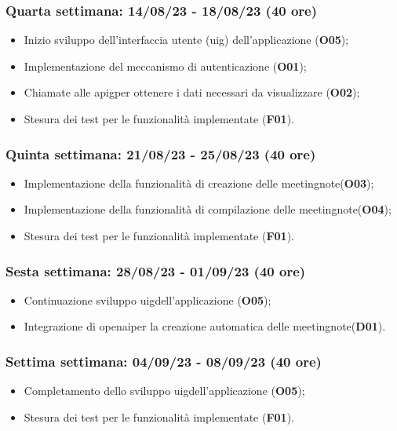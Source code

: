 \subsubsection{Quarta settimana: 14/08/23 - 18/08/23 (40 ore)}
    \begin{itemize}
        \item Inizio sviluppo dell'interfaccia utente (\gls{uig}\glsoccur) dell'applicazione (\textbf{O05});
        \item Implementazione del meccanismo di autenticazione (\textbf{O01});
        \item Chiamate alle \gls{apig}\glsoccur per ottenere i dati necessari da visualizzare (\textbf{O02});
        \item Stesura dei test per le funzionalità implementate (\textbf{F01}).
    \end{itemize}
\subsubsection{Quinta settimana: 21/08/23 - 25/08/23 (40 ore)}
    \begin{itemize}
        \item Implementazione della funzionalità di creazione delle \gls{meetingnote}\glsoccur (\textbf{O03});
        \item Implementazione della funzionalità di compilazione delle \gls{meetingnote}\glsoccur (\textbf{O04});
        \item Stesura dei test per le funzionalità implementate (\textbf{F01}).
    \end{itemize}
\subsubsection{Sesta settimana: 28/08/23 - 01/09/23 (40 ore)}
    \begin{itemize}
        \item Continuazione sviluppo \gls{uig}\glsoccur dell'applicazione (\textbf{O05});
        \item Integrazione di \gls{openai}\glsoccur per la creazione automatica delle \gls{meetingnote}\glsoccur (\textbf{D01}).
    \end{itemize}
\subsubsection{Settima settimana: 04/09/23 - 08/09/23 (40 ore)}
    \begin{itemize}
        \item Completamento dello sviluppo \gls{uig}\glsoccur dell'applicazione (\textbf{O05});
        \item Stesura dei test per le funzionalità implementate (\textbf{F01}).
    \end{itemize} 
